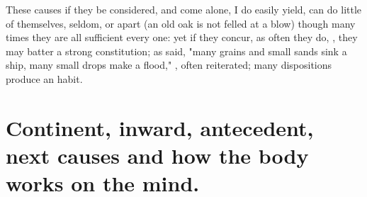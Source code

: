 
These causes if they be considered, and come alone, I do easily yield, can do
little of themselves, seldom, or apart (an old oak is not felled at a blow)
though many times they are all sufficient every one: yet if they concur, as
often they do, , they may batter a strong constitution; as \Austin{}
said, "many grains and small sands sink a ship, many small drops make a flood,"
\etc{}, often reiterated; many dispositions produce an habit.

\section{Continent, inward, antecedent, next causes and how the body works on
the mind.}

